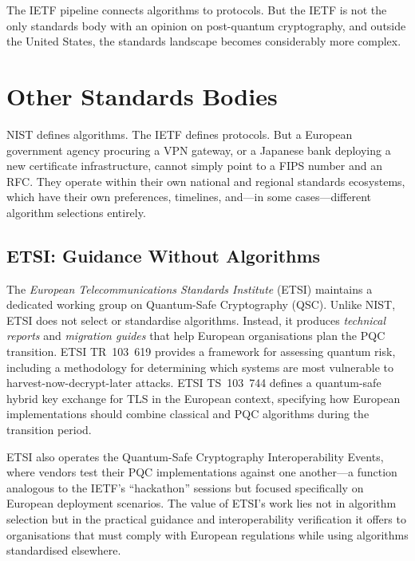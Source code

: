 The IETF pipeline connects algorithms to protocols. But the IETF is not the only standards body with an opinion on post-quantum cryptography, and outside the United States, the standards landscape becomes considerably more complex.


\section{Other Standards Bodies}
\label{sec:other-bodies}

NIST defines algorithms. The IETF defines protocols. But a European government agency procuring a VPN gateway, or a Japanese bank deploying a new certificate infrastructure, cannot simply point to a FIPS number and an RFC. They operate within their own national and regional standards ecosystems, which have their own preferences, timelines, and---in some cases---different algorithm selections entirely.

\subsection{ETSI: Guidance Without Algorithms}
\label{subsec:etsi}

The \emph{European Telecommunications Standards Institute} (ETSI) maintains a dedicated working group on Quantum-Safe Cryptography (QSC). Unlike NIST, ETSI does not select or standardise algorithms. Instead, it produces \emph{technical reports} and \emph{migration guides} that help European organisations plan the PQC transition. ETSI TR~103~619 provides a framework for assessing quantum risk, including a methodology for determining which systems are most vulnerable to harvest-now-decrypt-later attacks. ETSI TS~103~744 defines a quantum-safe hybrid key exchange for TLS in the European context, specifying how European implementations should combine classical and PQC algorithms during the transition period.

ETSI also operates the Quantum-Safe Cryptography Interoperability Events, where vendors test their PQC implementations against one another---a function analogous to the IETF's ``hackathon'' sessions but focused specifically on European deployment scenarios. The value of ETSI's work lies not in algorithm selection but in the practical guidance and interoperability verification it offers to organisations that must comply with European regulations while using algorithms standardised elsewhere.

